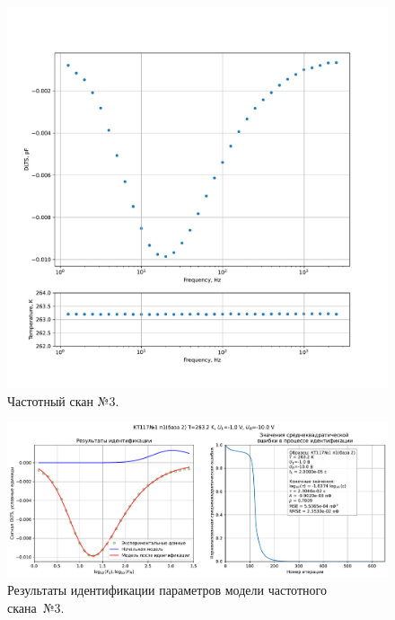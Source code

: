 \begin{figure}[!ht]
    \centering
    \includegraphics[width=1\textwidth]{../plots/КТ117№1_п1(база 2)_2500Гц-1Гц_1пФ_-10С_-1В-10В_200мВ_20мкс_шаг_0,1.pdf}
    \caption{Частотный скан №3.}
    \label{pic:frequency_scan_3}
\end{figure}

\begin{figure}[!ht]
    \centering
    \includegraphics[width=1\textwidth]{../plots/КТ117№1_п1(база 2)_2500Гц-1Гц_1пФ_-10С_-1В-10В_200мВ_20мкс_шаг_0,1_model.pdf}
    \caption{Результаты идентификации параметров модели частотного скана~№3.}
    \label{pic:frequency_scan_model3}
\end{figure}

\pagebreak


